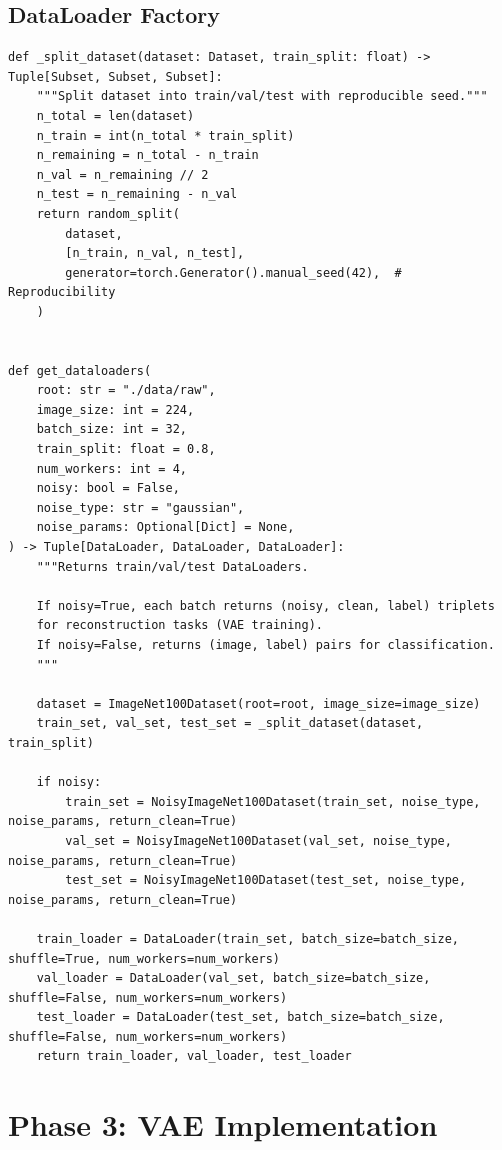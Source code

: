 \documentclass[11pt,a4paper]{article}
\begin{document}
\subsection{DataLoader Factory}

\begin{lstlisting}[caption={src/dataset.py - DataLoader Factory}, label={lst:dataloaders}]
def _split_dataset(dataset: Dataset, train_split: float) -> Tuple[Subset, Subset, Subset]:
    """Split dataset into train/val/test with reproducible seed."""
    n_total = len(dataset)
    n_train = int(n_total * train_split)
    n_remaining = n_total - n_train
    n_val = n_remaining // 2
    n_test = n_remaining - n_val
    return random_split(
        dataset,
        [n_train, n_val, n_test],
        generator=torch.Generator().manual_seed(42),  # Reproducibility
    )


def get_dataloaders(
    root: str = "./data/raw",
    image_size: int = 224,
    batch_size: int = 32,
    train_split: float = 0.8,
    num_workers: int = 4,
    noisy: bool = False,
    noise_type: str = "gaussian",
    noise_params: Optional[Dict] = None,
) -> Tuple[DataLoader, DataLoader, DataLoader]:
    """Returns train/val/test DataLoaders.

    If noisy=True, each batch returns (noisy, clean, label) triplets
    for reconstruction tasks (VAE training).
    If noisy=False, returns (image, label) pairs for classification.
    """

    dataset = ImageNet100Dataset(root=root, image_size=image_size)
    train_set, val_set, test_set = _split_dataset(dataset, train_split)

    if noisy:
        train_set = NoisyImageNet100Dataset(train_set, noise_type, noise_params, return_clean=True)
        val_set = NoisyImageNet100Dataset(val_set, noise_type, noise_params, return_clean=True)
        test_set = NoisyImageNet100Dataset(test_set, noise_type, noise_params, return_clean=True)

    train_loader = DataLoader(train_set, batch_size=batch_size, shuffle=True, num_workers=num_workers)
    val_loader = DataLoader(val_set, batch_size=batch_size, shuffle=False, num_workers=num_workers)
    test_loader = DataLoader(test_set, batch_size=batch_size, shuffle=False, num_workers=num_workers)
    return train_loader, val_loader, test_loader
\end{lstlisting}

\newpage
\section{Phase 3: VAE Implementation}
\label{sec:phase3}
\end{document}

